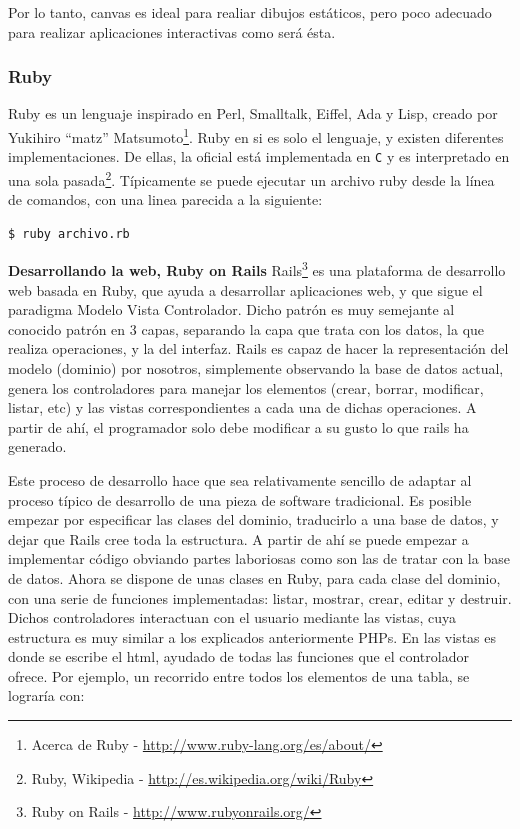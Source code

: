 Por lo tanto, canvas es ideal para realiar dibujos estáticos, pero poco adecuado para realizar aplicaciones interactivas como será ésta.

\subsubsection{Ruby}
Ruby es un lenguaje inspirado en Perl, Smalltalk, Eiffel, Ada y Lisp, creado por Yukihiro ``matz'' Matsumoto\footnote{Acerca de Ruby - \url{http://www.ruby-lang.org/es/about/}}. Ruby en si es solo el lenguaje, y existen diferentes implementaciones. De ellas, la oficial está implementada en \texttt{C} y es interpretado en una sola pasada\footnote{Ruby, Wikipedia - \url{http://es.wikipedia.org/wiki/Ruby}}. Típicamente se puede ejecutar un archivo ruby desde la línea de comandos, con una linea parecida a la siguiente:

\begin{verbatim}
$ ruby archivo.rb
\end{verbatim}

\textbf{Desarrollando la web, Ruby on Rails}
Rails\footnote{Ruby on Rails - \url{http://www.rubyonrails.org/}} es una plataforma de desarrollo web basada en Ruby, que ayuda a desarrollar aplicaciones web, y que sigue el paradigma Modelo Vista Controlador. Dicho patrón es muy semejante al conocido patrón en 3 capas, separando la capa que trata con los datos, la que realiza operaciones, y la del interfaz. Rails es capaz de hacer la representación del modelo (dominio) por nosotros, simplemente observando la base de datos actual, genera los controladores para manejar los elementos (crear, borrar, modificar, listar, etc) y las vistas correspondientes a cada una de dichas operaciones. A partir de ahí, el programador solo debe modificar a su gusto lo que rails ha generado.

Este proceso de desarrollo hace que sea relativamente sencillo de adaptar al proceso típico de desarrollo de una pieza de software tradicional. Es posible empezar por especificar las clases del dominio, traducirlo a una base de datos, y dejar que Rails cree toda la estructura. A partir de ahí se puede empezar a implementar código obviando partes laboriosas como son las de tratar con la base de datos. Ahora se dispone de unas clases en Ruby, para cada clase del dominio, con una serie de funciones implementadas: listar, mostrar, crear, editar y destruir. Dichos controladores interactuan con el usuario mediante las vistas, cuya estructura es muy similar a los explicados anteriormente PHPs. En las vistas es donde se escribe el html, ayudado de todas las funciones que el controlador ofrece. Por ejemplo, un recorrido entre todos los elementos de una tabla, se lograría con:

